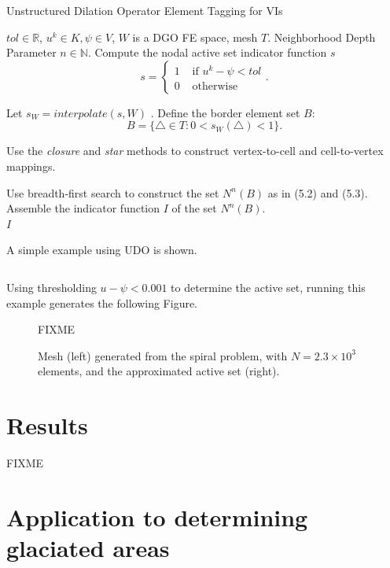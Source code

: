 \documentclass[]{interact}
\theoremstyle{plain}%
\theoremstyle{definition}
\theoremstyle{remark}
\begin{document}
\begin{algorithm}[H]
  \caption{Unstructured Dilation Operator Element Tagging for VIs}
  \begin{algorithmic}[1]
    \Require $tol \in \mathbb{R}$, $u^k \in K, \psi \in V$, $W$ is a DGO FE space, mesh $T$.
    \Require Neighborhood Depth Parameter $n \in \mathbb{N}$.
    \State Compute the nodal active set indicator function $s$
    \begin{equation}
    s = \begin{cases}
      1 & \text{ if } u^k - \psi < tol\\
      0 & \text{ otherwise}
    \end{cases}.
    \end{equation}
  
    \State Let $s_W = interpolate(s, W)$ .
    \State Define the border element set $B$:
    \begin{equation}
    B = \{\triangle \in T: 0 < s_W(\triangle) < 1 \} .
    \end{equation}

    \State Use the \emph{closure} and \emph{star} methods to construct vertex-to-cell and cell-to-vertex mappings.

    \State Use breadth-first search to construct the set $N^n(B)$ as in (5.2) and (5.3). 
    \State Assemble the indicator function $I$ of the set $N^n(B)$. \\
    \Return $I$
  \end{algorithmic}
  \end{algorithm}

A simple example using UDO is shown.

\inputminted{python}{short.py}

Using thresholding $u - \psi < 0.001$ to determine the active set, running this example generates the following Figure.

\begin{figure}[H]
FIXME
\caption{Mesh (left) generated from the spiral problem, with $N=2.3\times 10^3$ elements, and the approximated active set (right).}
\end{figure}

\section{Results} \label{sec:results}

FIXME

\section{Application to determining glaciated areas} \label{sec:app}
\end{document}
